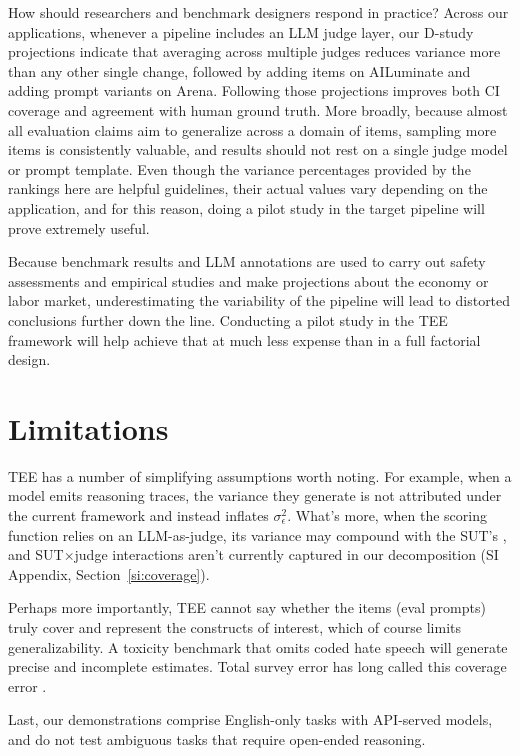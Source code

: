 \documentclass{article}
\begin{document}
How should researchers and benchmark designers respond in practice? Across our applications, whenever a pipeline includes an LLM judge layer, our D-study projections indicate that averaging across multiple judges reduces variance more than any other single change, followed by adding items on AILuminate and adding prompt variants on Arena. Following those projections improves both CI coverage and agreement with human ground truth. More broadly, because almost all evaluation claims aim to generalize across a domain of items, sampling more items is consistently valuable, and results should not rest on a single judge model or prompt template. Even though the variance percentages provided by the rankings here are helpful guidelines, their actual values vary depending on the application, and for this reason, doing a pilot study in the target pipeline will prove extremely useful.

Because benchmark results and LLM annotations are used to carry out safety assessments and empirical studies and make projections about the economy or labor market, underestimating the variability of the pipeline will lead to distorted conclusions further down the line. Conducting a pilot study in the TEE framework will help achieve that at much less expense than in a full factorial design.



\section{Limitations}
\label{sec:limitations}


TEE has a number of simplifying assumptions worth noting. For example, when a model emits reasoning traces, the variance they generate is not attributed under the current framework and instead inflates $\sigma^2_\epsilon$. What's more, when the scoring function relies on an LLM-as-judge, its variance may compound with the SUT's \citep{haldar2025roulette, chehbouni2025neither}, and SUT$\times$judge interactions aren't currently captured in our decomposition (SI Appendix, Section~\ref{si:coverage}). 

Perhaps more importantly, TEE cannot say whether the items (eval prompts) truly cover and represent the constructs of interest, which of course limits generalizability. A toxicity benchmark that omits coded hate speech will generate precise and incomplete estimates. Total survey error has long called this coverage error \citep{sen2019tedon}.

Last, our demonstrations comprise English-only tasks with API-served models, and do not test ambiguous tasks that require open-ended reasoning. 
\end{document}
